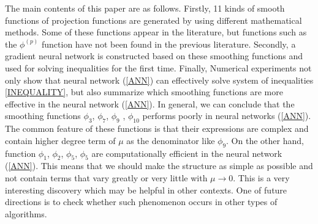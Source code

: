 \documentclass[12pt]{article}
\begin{document}
 The main contents of this paper are as follows. Firstly, 11 kinds of smooth functions
 of projection functions are generated by using different mathematical methods.
 Some of these functions appear in the literature, but functions such as the $\phi^{(p)}$
 function have not been found in the previous literature.
 Secondly, a gradient neural network is constructed based on these smoothing functions and used
 for solving inequalities for the first time. Finally, Numerical experiments not only show that
 neural network  (\ref{ANN}) can effectively solve system of inequalities \eqref{INEQUALITY},
 but also summarize which smoothing functions are more effective in the neural network (\ref{ANN}).
 In general, we can conclude that the smoothing functions $\phi_3$,
 $\phi_7$, $\phi_9$ , $\phi_{10}$ performs poorly in neural networks (\ref{ANN}).
 The common feature of these functions is that their expressions are complex and
 contain higher degree term of $\mu$ as the denominator like $\phi_9$.
 On the other hand, function $\phi_1$, $\phi_2$, $\phi_5$, $\phi_5$ are computationally efficient
 in the neural network (\ref{ANN}).
 This means that we should make  the structure as simple as possible and not contain
 terms that vary greatly or very little with $\mu \rightarrow 0$.
 This is a very interesting discovery which may be helpful in other contexts. One of future
 directions is to check whether such phenomenon occurs in other types of algorithms.



 \medskip
\end{document}
